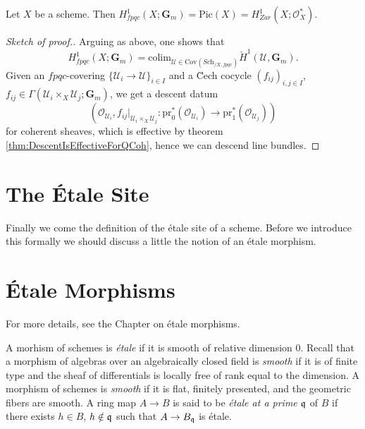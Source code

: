 \begin{theorem}
Let $X$ be a scheme. Then $H_{fpqc}^1(X ; \mathbf{G}_m) = \text{Pic} (X) = 
H_{Zar}^1(X; \mathcal{O}_X^*)$.
\end{theorem}

\begin{proof}[Sketch of proof.]
Arguing as above, one shows that
$$
H_{fpqc}^1(X ; \mathbf{G}_m) = \text{colim}_{\mathcal{U} \in 
\text{Cov}(\textit{Sch}_{/X,fpqc})} \check H^1(\mathcal{U}, \mathbf{G}_m).
$$
Given an $fpqc$-covering $\{ \mathcal{U}_i \to \mathcal{U} \}_{i \in I}$ and a 
\u Cech cocycle $(f_{ij})_{i,j \in I}$, $f_{ij} \in \Gamma(\mathcal{U}_i 
\times_X \mathcal{U}_j; \mathbf{G}_m)$, we get a descent datum
$$
\left(\mathcal{O}_{\mathcal{U}_i}, f_{ij} |_{\mathcal{U}_i \times_X 
\mathcal{U}_j}: \text{pr}_0^*(\mathcal{O}_{\mathcal{U}_i}) \to 
\text{pr}_1^*(\mathcal{O}_{\mathcal{U}_j})\right)
$$
for coherent sheaves, which is effective by theorem 
\ref{thm:DescentIsEffectiveForQCoh}, hence we can descend line bundles.
\end{proof}

\section{The \'Etale Site}
\label{section-etale-site}

\noindent
Finally we come the definition of the \'etale site of a scheme.
Before we introduce this formally we should discuss a little the
notion of an \'etale morphism.


\section{\'Etale Morphisms}
\label{section-etale-morphism}

\noindent
For more details, see the Chapter on \'etale morphisms.

\begin{definition}
A morhism of schemes is \emph{\'etale} if it is smooth of relative dimension 0. 
Recall that a morphism of algebras over an algebraically closed field is 
\emph{smooth} if it is of finite type and the sheaf of differentials is locally 
free of rank equal to the dimension. A morphism of schemes is \emph{smooth} if 
it is flat, finitely presented, and the geometric fibers are smooth. A ring map 
$A \to B$ is said to be \emph{\'etale at a prime $\frak q$} of $B$ if there 
exists $h \in B$, $h \notin \frak q$ such that $A \to B_{\frak q}$ is \'etale.
\end{definition}

